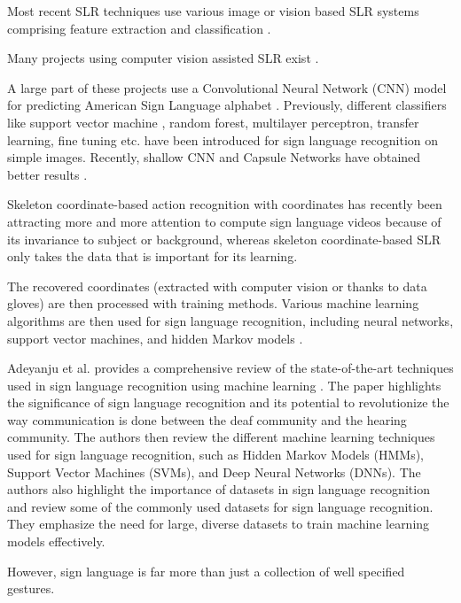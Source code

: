 Most recent SLR techniques use various image or vision based SLR systems comprising feature extraction and classification \cite{nimisha2020brief}. 

Many projects using computer vision assisted SLR exist \cite{admasu2010ethiopian} \cite{deriche2019intelligent} \cite{ahram2021advances} \cite{song2021intelligent} \cite{lee2021american} \cite{lee2021comparative} \cite{gao2021rnn}. 

A large part of these projects use a Convolutional Neural Network (CNN) model for predicting American Sign Language alphabet \cite{bin2019study}. Previously, different classifiers like support vector machine \cite{savur2015real}, random forest, multilayer perceptron, transfer learning, fine tuning \cite{saleh2020arabic} etc. have been introduced for sign language recognition on simple images. Recently, shallow CNN and Capsule Networks have obtained better results \cite{hasan2020classification}. 

Skeleton coordinate-based action recognition with coordinates has recently been attracting more and more attention to compute sign language videos because of its invariance to subject or background, whereas skeleton coordinate-based SLR only takes the data that is important for its learning. 

The recovered coordinates (extracted with computer vision or thanks to data gloves) are then processed with training methods. Various machine learning algorithms are then used for sign language recognition, including neural networks, support vector machines, and hidden Markov models \cite{9178440}.

Adeyanju et al. provides a comprehensive review of the state-of-the-art techniques used in sign language recognition using machine learning \cite{almeida2014feature}. The paper highlights the significance of sign language recognition and its potential to revolutionize the way communication is done between the deaf community and the hearing community. The authors then review the different machine learning techniques used for sign language recognition, such as Hidden Markov Models (HMMs), Support Vector Machines (SVMs), and Deep Neural Networks (DNNs).
The authors also highlight the importance of datasets in sign language recognition and review some of the commonly used datasets for sign language recognition. They emphasize the need for large, diverse datasets to train machine learning models effectively.

However, sign language is far more than just a collection of well specified gestures.

